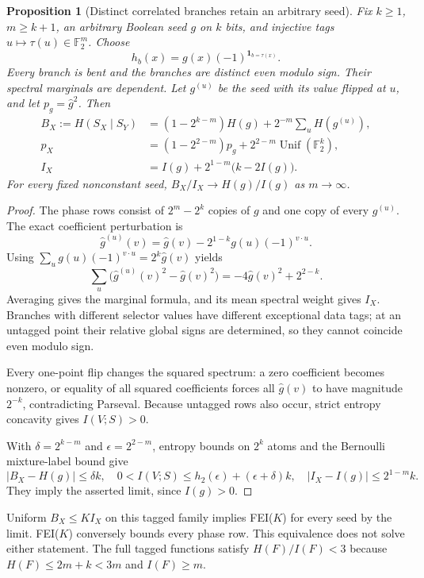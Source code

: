 \documentclass[11pt]{article}
\newtheorem{proposition}{Proposition}
\newcommand{\F}{\mathbb F}
\newcommand{\wh}{\widehat}
\begin{document}
\begin{proposition}[Distinct correlated branches retain an arbitrary seed]
Fix $k\ge1$, $m\ge k+1$, an arbitrary Boolean seed $g$ on $k$ bits, and injective tags $u\mapsto\tau(u)\in\F_2^m$. Choose
\[
 h_b(x)=g(x)(-1)^{\mathbf1_{b=\tau(x)}}.
\]
Every branch is bent and the branches are distinct even modulo sign. Their spectral marginals are dependent. Let $g^{(u)}$ be the seed with its value flipped at $u$, and let $p_g=\wh g^2$. Then
\begin{align*}
 B_X:=H(S_X\mid S_Y)
 &= (1-2^{k-m})H(g)+2^{-m}\sum_u H(g^{(u)}),\\
 p_X&=(1-2^{2-m})p_g+2^{2-m}\operatorname{Unif}(\F_2^k),\\
 I_X&=I(g)+2^{1-m}\bigl(k-2I(g)\bigr).
\end{align*}
For every fixed nonconstant seed, $B_X/I_X\to H(g)/I(g)$ as $m\to\infty$.
\end{proposition}
\begin{proof}
The phase rows consist of $2^m-2^k$ copies of $g$ and one copy of every $g^{(u)}$. The exact coefficient perturbation is
\[
 \wh g^{(u)}(v)=\wh g(v)-2^{1-k}g(u)(-1)^{v\cdot u}.
\]
Using $\sum_u g(u)(-1)^{v\cdot u}=2^k\wh g(v)$ yields
\[
 \sum_u\bigl(\wh g^{(u)}(v)^2-\wh g(v)^2\bigr)
 =-4\wh g(v)^2+2^{2-k}.
\]
Averaging gives the marginal formula, and its mean spectral weight gives $I_X$.
Branches with different selector values have different exceptional data tags; at an untagged point their relative global signs are determined, so they cannot coincide even modulo sign.

Every one-point flip changes the squared spectrum: a zero coefficient becomes nonzero, or equality of all squared coefficients forces all $\wh g(v)$ to have magnitude $2^{-k}$, contradicting Parseval. Because untagged rows also occur, strict entropy concavity gives $I(V;S)>0$.

With $\delta=2^{k-m}$ and $\epsilon=2^{2-m}$, entropy bounds on $2^k$ atoms and the Bernoulli mixture-label bound give
\[
 |B_X-H(g)|\le\delta k,\quad
 0<I(V;S)\le h_2(\epsilon)+(\epsilon+\delta)k,\quad
 |I_X-I(g)|\le2^{1-m}k.
\]
They imply the asserted limit, since $I(g)>0$.
\end{proof}

Uniform $B_X\le K I_X$ on this tagged family implies FEI($K$) for every seed by the limit. FEI($K$) conversely bounds every phase row. This equivalence does not solve either statement. The full tagged functions satisfy $H(F)/I(F)<3$ because $H(F)\le2m+k<3m$ and $I(F)\ge m$.
\end{document}
